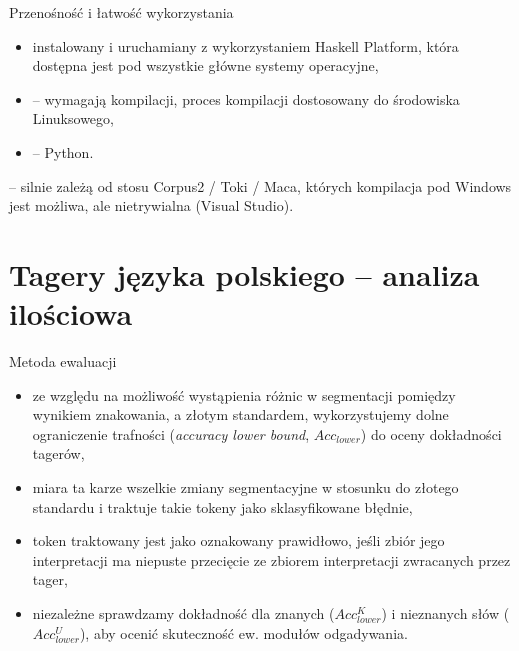 \documentclass[xcolor=dvipsnames,polish]{beamer}
\begin{document}
\begin{frame}{Przenośność i łatwość wykorzystania}
  \begin{itemize}
    \item {} instalowany i uruchamiany z wykorzystaniem Haskell Platform, która dostępna jest pod wszystkie główne systemy operacyjne,
    \item {} -- wymagają kompilacji, proces kompilacji dostosowany do środowiska Linuksowego,
    \item {} -- Python.
  \end{itemize}
  \vspace{1cm}

   -- silnie zależą od stosu Corpus2 / Toki / Maca, których kompilacja pod Windows jest możliwa, ale nietrywialna (Visual Studio).
\end{frame}


\section{Tagery języka polskiego -- analiza ilościowa}
\frame{\sectionpage}

\begin{frame}{Metoda ewaluacji}
\begin{itemize}
\item ze względu na możliwość wystąpienia różnic w segmentacji pomiędzy wynikiem znakowania, a złotym standardem, wykorzystujemy dolne ograniczenie trafności (\emph{accuracy lower bound}, $Acc_{lower}$) do oceny dokładności tagerów,
\item miara ta karze wszelkie zmiany segmentacyjne w stosunku do złotego standardu i traktuje takie tokeny jako sklasyfikowane błędnie,
\item token traktowany jest jako oznakowany prawidłowo, jeśli zbiór jego interpretacji ma niepuste przecięcie ze zbiorem interpretacji zwracanych przez tager,
\item niezależne sprawdzamy dokładność dla znanych ($Acc^K_{lower}$) i nieznanych słów ($Acc^U_{lower}$), aby ocenić skuteczność ew. modułów odgadywania.
\end{itemize}
\end{frame}
\end{document}
